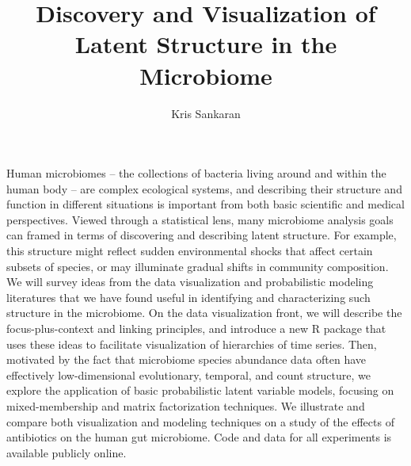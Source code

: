 \documentclass{article}
\title{Discovery and Visualization of Latent Structure in the Microbiome}
\author{Kris Sankaran}
\begin{document}
Human microbiomes -- the collections of bacteria living around and within the
human body -- are complex ecological systems, and describing their structure and
function in different situations is important from both basic scientific and
medical perspectives. Viewed through a statistical lens, many microbiome
analysis goals can framed in terms of discovering and describing latent
structure. For example, this structure might reflect sudden environmental shocks
that affect certain subsets of species, or may illuminate gradual shifts in
community composition. We will survey ideas from the data visualization and
probabilistic modeling literatures that we have found useful in identifying and
characterizing such structure in the microbiome. On the data visualization
front, we will describe the focus-plus-context and linking principles, and
introduce a new R package that uses these ideas to facilitate visualization of
hierarchies of time series. Then, motivated by the fact that microbiome species
abundance data often have effectively low-dimensional evolutionary, temporal,
and count structure, we explore the application of basic probabilistic latent
variable models, focusing on mixed-membership and matrix factorization
techniques. We illustrate and compare both visualization and modeling techniques
on a study of the effects of antibiotics on the human gut microbiome. Code and
data for all experiments is available publicly online.
\end{document}
